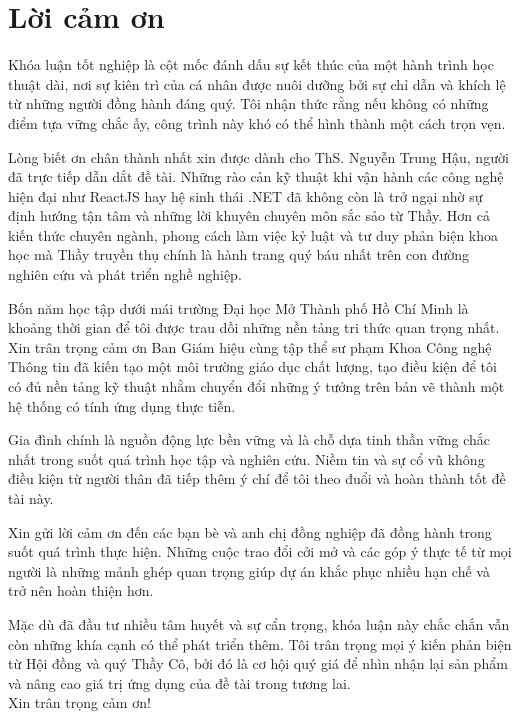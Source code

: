 \chapter*{Lời cảm ơn}

Khóa luận tốt nghiệp là cột mốc đánh dấu sự kết thúc của một hành trình học thuật dài, nơi sự kiên trì của cá nhân được nuôi dưỡng bởi sự chỉ dẫn và khích lệ từ những người đồng hành đáng quý. Tôi nhận thức rằng nếu không có những điểm tựa vững chắc ấy, công trình này khó có thể hình thành một cách trọn vẹn.

Lòng biết ơn chân thành nhất xin được dành cho ThS. Nguyễn Trung Hậu, người đã trực tiếp dẫn dắt đề tài. Những rào cản kỹ thuật khi vận hành các công nghệ hiện đại như ReactJS hay hệ sinh thái .NET đã không còn là trở ngại nhờ sự định hướng tận tâm và những lời khuyên chuyên môn sắc sảo từ Thầy. Hơn cả kiến thức chuyên ngành, phong cách làm việc kỷ luật và tư duy phản biện khoa học mà Thầy truyền thụ chính là hành trang quý báu nhất trên con đường nghiên cứu và phát triển nghề nghiệp.

Bốn năm học tập dưới mái trường Đại học Mở Thành phố Hồ Chí Minh là khoảng thời gian để tôi được trau dồi những nền tảng tri thức quan trọng nhất. Xin trân trọng cảm ơn Ban Giám hiệu cùng tập thể sư phạm Khoa Công nghệ Thông tin đã kiến tạo một môi trường giáo dục chất lượng, tạo điều kiện để tôi có đủ nền tảng kỹ thuật nhằm chuyển đổi những ý tưởng trên bản vẽ thành một hệ thống có tính ứng dụng thực tiễn.

Gia đình chính là nguồn động lực bền vững và là chỗ dựa tinh thần vững chắc nhất trong suốt quá trình học tập và nghiên cứu. Niềm tin và sự cổ vũ không điều kiện từ người thân đã tiếp thêm ý chí để tôi theo đuổi và hoàn thành tốt đề tài này.

Xin gửi lời cảm ơn đến các bạn bè và anh chị đồng nghiệp đã đồng hành trong suốt quá trình thực hiện. Những cuộc trao đổi cởi mở và các góp ý thực tế từ mọi người là những mảnh ghép quan trọng giúp dự án khắc phục nhiều hạn chế và trở nên hoàn thiện hơn.

Mặc dù đã đầu tư nhiều tâm huyết và sự cẩn trọng, khóa luận này chắc chắn vẫn còn những khía cạnh có thể phát triển thêm. Tôi trân trọng mọi ý kiến phản biện từ Hội đồng và quý Thầy Cô, bởi đó là cơ hội quý giá để nhìn nhận lại sản phẩm và nâng cao giá trị ứng dụng của đề tài trong tương lai.\\

\noindent Xin trân trọng cảm ơn!
